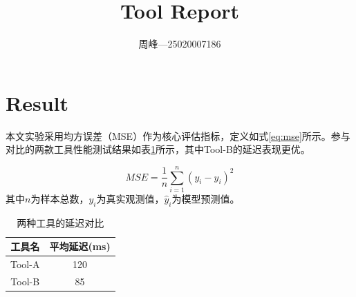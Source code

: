 \documentclass{article}
\begin{document}
\title{Tool Report}
\author{周峰—25020007186}
\maketitle

\section{Result}
本文实验采用均方误差（MSE）作为核心评估指标，定义如式\eqref{eq:mse}所示。参与对比的两款工具性能测试结果如表\ref{tab:latency}所示，其中Tool-B的延迟表现更优。

\begin{equation}
\label{eq:mse}
MSE = \frac{1}{n}\sum_{i=1}^{n} (y_i - \hat{y}_i)^2
\end{equation}
其中$n$为样本总数，$y_i$为真实观测值，$\hat{y}_i$为模型预测值。

\begin{table}[htbp]
\centering
\caption{两种工具的延迟对比}
\label{tab:latency}
\begin{tabular}{|c|c|}
\hline
工具名 & 平均延迟(ms) \\
\hline
Tool-A & 120 \\
\hline
Tool-B & 85 \\
\hline
\end{tabular}
\end{table}
\end{document}
